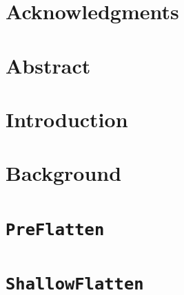 \documentclass[12pt,oneside,letterpaper]{report}
\begin{document}
\chapter*{Acknowledgments}

\newpage

\chapter*{Abstract}

\newpage

\tableofcontents

\cleardoublepage
{}
{}
\listoffigures
\newpage

\cleardoublepage
{}
{}
\listoftables
\newpage



\chapter{Introduction} \label{ch:introductory}


\chapter{Background} \label{ch:background}


\chapter{\texttt{PreFlatten}} \label{ch:preflatten}


\chapter{\texttt{ShallowFlatten}} \label{ch:shallowflatten}

\end{document}

